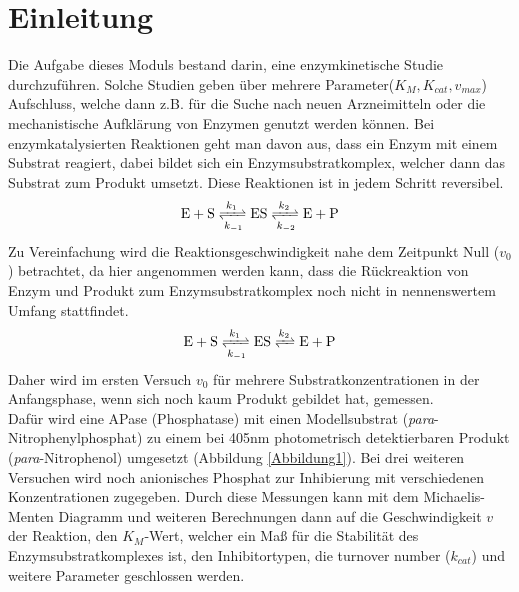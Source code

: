 \section{Einleitung}

Die Aufgabe dieses Moduls bestand darin, eine enzymkinetische Studie durchzuführen. Solche Studien geben über mehrere Parameter($K_M, K_{cat}, v_{max}$) Aufschluss, welche dann z.B. für die Suche nach neuen Arzneimitteln oder die mechanistische Aufklärung von Enzymen genutzt werden können. Bei enzymkatalysierten Reaktionen geht man davon aus, dass ein Enzym mit einem Substrat reagiert, dabei bildet sich ein Enzymsubstratkomplex, welcher dann das Substrat zum Produkt umsetzt. Diese Reaktionen ist in jedem Schritt reversibel. 
 \begin{align}
    \mathrm{E} + \mathrm{S} \xrightleftharpoons[k_{-1}]{k_1} \mathrm{ES}
    \xrightleftharpoons[k_{-2}]{k_2} \mathrm{E} + \mathrm{P}
 \end{align}
 Zu Vereinfachung wird die Reaktionsgeschwindigkeit nahe dem Zeitpunkt Null ($v_0$) betrachtet, da hier angenommen werden kann, dass die Rückreaktion von Enzym und Produkt zum Enzymsubstratkomplex noch nicht in nennenswertem Umfang stattfindet.  
 \begin{align}
    \mathrm{E} + \mathrm{S} \xrightleftharpoons[k_{-1}]{k_1} \mathrm{ES}
    \xrightleftharpoons{k_2} \mathrm{E} + \mathrm{P}
 \end{align}
 Daher wird im ersten Versuch $v_0$ für mehrere Substratkonzentrationen in der Anfangsphase, wenn sich noch kaum Produkt gebildet hat, gemessen. \\
 Dafür wird eine APase (Phosphatase) mit einen Modellsubstrat (\textit{para}-Nitrophenylphosphat) zu einem bei 405nm photometrisch detektierbaren Produkt (\textit{para}-Nitrophenol) umgesetzt (Abbildung \ref{Abbildung1}).
 Bei drei weiteren Versuchen wird noch anionisches Phosphat zur Inhibierung mit verschiedenen Konzentrationen zugegeben. Durch diese Messungen kann mit dem Michaelis-Menten Diagramm und weiteren Berechnungen dann auf die Geschwindigkeit $v$ der Reaktion, den $K_M$-Wert, welcher ein Maß für die Stabilität des Enzymsubstratkomplexes ist, den Inhibitortypen, die turnover number ($k_{cat}$) und weitere Parameter geschlossen werden.
  
